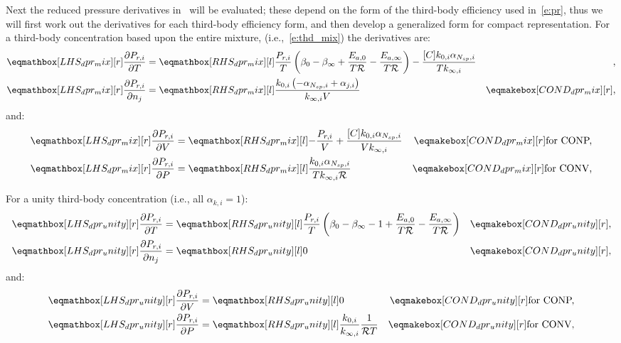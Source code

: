 \documentclass[12pt]{article}
\newcommand{\ns}{N_{sp}}
\newcommand{\conp}{CONP}
\newcommand{\conv}{CONV}
\newcommand{\dconp}{\ifmmode\text{for \conp,}\else for \conp,\fi}
\newcommand{\dconv}{\ifmmode\text{for \conv,}\else for \conv,\fi}
\newcommand{\Ru}{\mathcal{R}}
\begin{document}
Next the reduced pressure derivatives in~ will be evaluated; these depend on the form of the third-body efficiency used in~\cref{e:pr}, thus we will first work out the derivatives for each third-body efficiency form, and then develop a generalized form for compact representation.
For a third-body concentration based upon the entire mixture, (i.e.,~\cref{e:thd_mix}) the derivatives are:
\begin{align}
 \lhs{dpr_mix}{\frac{\partial P_{r, i} }{\partial T }} &= \rhs{dpr_mix}{\frac{P_{r, i}}{T} \left(\beta_{0} - \beta_{\infty} + \frac{E_{a, 0}}{T \Ru} - \frac{E_{a, \infty}}{T \Ru}\right) - \frac{[C] k_{0, i} \alpha_{\ns,i}}{T k_{\infty, i}}} & {,} \label{e:dpr_mix_dt} \\
 \lhs{dpr_mix}{\frac{\partial P_{r, i} }{\partial n_j }} &= \rhs{dpr_mix}{\frac{k_{0, i} \left(- \alpha_{\ns,i} + \alpha_{j,i}\right)}{k_{\infty, i} V}} & \cond{dpr_mix}{,} \label{e:dpr_mix_dnj}
\end{align}
and:
\begin{subequations}
 \label{e:dpr_mix_de}
 \begin{align}
  \lhs{dpr_mix}{\frac{\partial P_{r, i} }{\partial V }} &= \rhs{dpr_mix}{- \frac{P_{r, i}}{V} + \frac{[C] k_{0, i} \alpha_{\ns,i}}{V k_{\infty, i}}} & \cond{dpr_mix}{\dconp} \\
  \lhs{dpr_mix}{\frac{\partial P_{r, i} }{\partial P }} &= \rhs{dpr_mix}{\frac{k_{0, i} \alpha_{\ns,i}}{T k_{\infty, i} \Ru}} & \cond{dpr_mix}{\dconv}
 \end{align}
\end{subequations}

For a unity third-body concentration (i.e., all $\alpha_{k,i}=1$):
\begin{align}
 \lhs{dpr_unity}{\frac{\partial P_{r, i} }{\partial T }} &= \rhs{dpr_unity}{\frac{P_{r, i}}{T} \left(\beta_{0} - \beta_{\infty} - 1 + \frac{E_{a, 0}}{T \Ru} - \frac{E_{a, \infty}}{T \Ru}\right)} & \cond{dpr_unity}{,} \label{e:dpr_unity_dt} \\
 \lhs{dpr_unity}{\frac{\partial P_{r, i} }{\partial n_j }} &= \rhs{dpr_unity}{0} & \cond{dpr_unity}{,} \label{e:dpr_unity_dnj}
\end{align}
and:
\begin{subequations}
 \label{e:dpr_unity_de}
 \begin{align}
  \lhs{dpr_unity}{\frac{\partial P_{r, i} }{\partial V }} &= \rhs{dpr_unity}{0} & \cond{dpr_unity}{\dconp}\\
  \lhs{dpr_unity}{\frac{\partial P_{r, i} }{\partial P }} &= \rhs{dpr_unity}{\frac{k_{0, i}}{k_{\infty, i}} \frac{1}{\Ru T}} & \cond{dpr_unity}{\dconv}
 \end{align}
\end{subequations}
\end{document}
